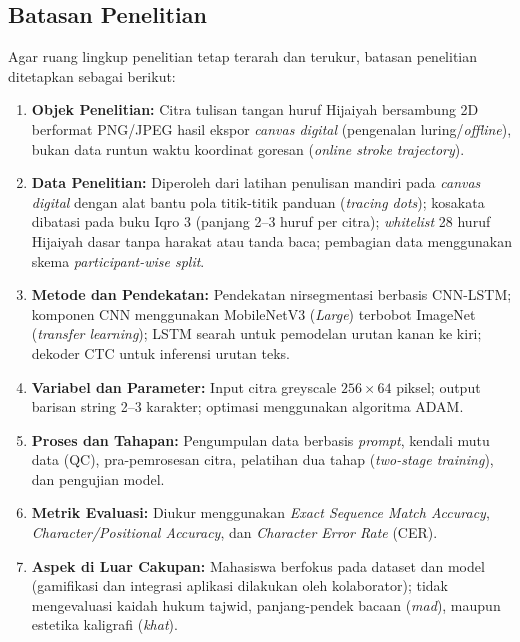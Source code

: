 \documentclass[conference]{IEEEtran}
\begin{document}
\subsection{Batasan Penelitian}
Agar ruang lingkup penelitian tetap terarah dan terukur, batasan penelitian ditetapkan sebagai berikut:
\begin{enumerate}
    \item \textbf{Objek Penelitian:} Citra tulisan tangan huruf Hijaiyah bersambung 2D berformat PNG/JPEG hasil ekspor \textit{canvas digital} (pengenalan luring/\textit{offline}), bukan data runtun waktu koordinat goresan (\textit{online stroke trajectory}).
    \item \textbf{Data Penelitian:} Diperoleh dari latihan penulisan mandiri pada \textit{canvas digital} dengan alat bantu pola titik-titik panduan (\textit{tracing dots}); kosakata dibatasi pada buku Iqro 3 (panjang 2--3 huruf per citra); \textit{whitelist} 28 huruf Hijaiyah dasar tanpa harakat atau tanda baca; pembagian data menggunakan skema \textit{participant-wise split}.
    \item \textbf{Metode dan Pendekatan:} Pendekatan nirsegmentasi berbasis CNN-LSTM; komponen CNN menggunakan MobileNetV3 (\textit{Large}) terbobot ImageNet (\textit{transfer learning}); LSTM searah untuk pemodelan urutan kanan ke kiri; dekoder CTC untuk inferensi urutan teks.
    \item \textbf{Variabel dan Parameter:} Input citra greyscale $256 \times 64$ piksel; output barisan string 2--3 karakter; optimasi menggunakan algoritma ADAM.
    \item \textbf{Proses dan Tahapan:} Pengumpulan data berbasis \textit{prompt}, kendali mutu data (QC), pra-pemrosesan citra, pelatihan dua tahap (\textit{two-stage training}), dan pengujian model.
    \item \textbf{Metrik Evaluasi:} Diukur menggunakan \textit{Exact Sequence Match Accuracy}, \textit{Character/Positional Accuracy}, dan \textit{Character Error Rate} (CER).
    \item \textbf{Aspek di Luar Cakupan:} Mahasiswa berfokus pada dataset dan model (gamifikasi dan integrasi aplikasi dilakukan oleh kolaborator); tidak mengevaluasi kaidah hukum tajwid, panjang-pendek bacaan (\textit{mad}), maupun estetika kaligrafi (\textit{khat}).
\end{enumerate}
\end{document}
